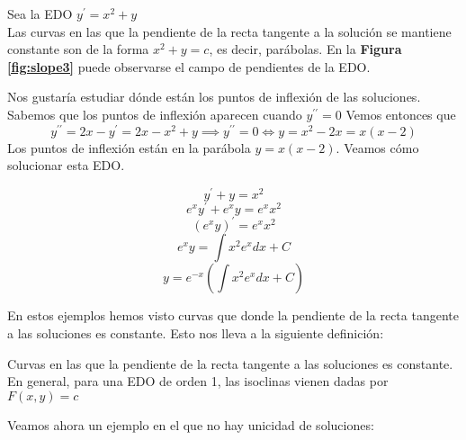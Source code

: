 
\begin{example}
Sea la EDO $y^\prime = x^2+y$\\
Las curvas en las que la pendiente de la recta tangente a la solución se mantiene constante son de la forma $x^2+y=c$, es decir, parábolas. En la \textbf{Figura \ref{fig:slope3}} puede observarse el campo de pendientes de la EDO.

Nos gustaría estudiar dónde están los puntos de inflexión de las soluciones. Sabemos que los puntos de inflexión aparecen cuando $y^{\prime\prime} = 0$
Vemos entonces que
$$y^{\prime\prime} =  2x-y^\prime = 2x-x^2+y \implies y^{\prime\prime} = 0 \iff y = x^2-2x=x(x-2)$$
Los puntos de inflexión están en la parábola $y=x(x-2)$.
Veamos cómo solucionar esta EDO.

$$y^\prime + y = x^2$$
$$e^xy^\prime + e^xy = e^xx^2$$
$$(e^xy)^\prime = e^xx^2$$
$$e^xy = \int x^2e^xdx + C$$
$$y = e^{-x}(\int x^2e^xdx+C)$$
\end{example}

En estos ejemplos hemos visto curvas que donde la pendiente de la recta tangente a las soluciones es constante. Esto nos lleva a la siguiente definición:

\begin{definition}
Curvas en las que la pendiente de la recta tangente a las soluciones es constante.
En general, para una EDO de orden 1, las isoclinas vienen dadas por $F(x,y) = c$
\end{definition}

Veamos ahora un ejemplo en el que no hay unicidad de soluciones:


